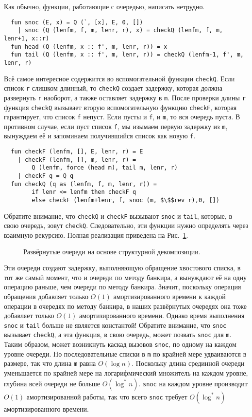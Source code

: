 Как обычно, функции, работающие с очередью, написать нетрудно.
\begin{lstlisting}
  fun snoc (E, x) = Q (`, [x], E, 0, [])
    | snoc (Q (lenfm, f, m, lenr, r), x) = checkQ (lenfm, f, m, lenr+1, x::r)
  fun head (Q (lenfm, x :: f', m, lenr, r)) = x
  fun tail (Q (lenfm, x :: f', m, lenr, r)) = checkQ (lenfm-1, f', m, lenr, r)
\end{lstlisting}
Всё самое интересное содержится во вспомогательной функции
\lstinline!checkQ!. Если список \lstinline!r! слишком длинный, то
\lstinline!checkQ! создает задержку, которая должна развернуть
\lstinline!r! наоборот, а также оставляет задержку в \lstinline!m!.
После проверки длины \lstinline!r! функция \lstinline!checkQ! вызывает
вторую вспомогательную функцию \lstinline!checkF!, которая
гарантирует, что список \lstinline!f! непуст. Если пусты и
\lstinline!f!, и \lstinline!m!, то вся очередь пуста. В противном
случае, если пуст список \lstinline!f!, мы изымаем первую задержку из
\lstinline!m!, вынуждаем её и запоминаем получившийся список как
новую \lstinline!f!.
\begin{lstlisting}
  fun checkF (lenfm, [], E, lenr, r) = E
    | checkF (lenfm, [], m, lenr, r) =
        Q (lenfm, force (head m), tail m, lenr, r)
    | checkF q = Q q
  fun checkQ (q as (lenfm, f, m, lenr, r)) =
        if lenr <= lenfm then checkF q
        else checkF (lenfm+lenr, f, snoc (m, $\$$rev r),0, [])
\end{lstlisting}
Обратите внимание, что \lstinline!checkQ! и \lstinline!checkF!
вызывают \lstinline!snoc! и \lstinline!tail!, которые, в свою очередь,
зовут \lstinline!checkQ!. Следовательно, эти функции нужно определять
через взаимную рекурсию. Полная реализация приведена на
Рис.~\ref{fig:10.2}.

\begin{figure}
  \centering

  \caption{Развёрнутые очереди на основе структурной декомпозиции.}
  \label{fig:10.2}
\end{figure}

Эти очереди создают задержку, выполняющую обращение хвостового списка,
в тот же самый момент, что и очереди по методу банкира, а вынуждают её
на одну операцию раньше, чем очереди по методу банкира. Значит,
поскольку операция обращения добавляет только $O(1)$ амортизированного
времени к каждой операции в очередях по методу банкира, в наших
развёрнутых очередях она тоже добавляет только $O(1)$
амортизированного времени. Однако время выполнения \lstinline!snoc! и
\lstinline!tail! больше не является константой! Обратите внимание, что
\lstinline!snoc! вызывает \lstinline!checkQ!, а эта функция, в свою
очередь, может позвать \lstinline!snoc! для \lstinline!m!. Таким
образом, может возникнуть каскад вызовов \lstinline!snoc!, по одному
на каждом уровне очереди. Но последовательные списки в
\lstinline!m! по крайней мере удваиваются в размере, так что длина
\lstinline!m! равна $O(\log n)$. Поскольку длина срединной очереди
уменьшается по крайней мере на логарифмический множитель на каждом
уровне, глубина всей очереди не больше $O(\log^* n)$. \lstinline!snoc! на
каждом уровне производит $O(1)$ амортизированной работы, так что всего
\lstinline!snoc! требует $O(\log^* n)$ амортизированного времени.

